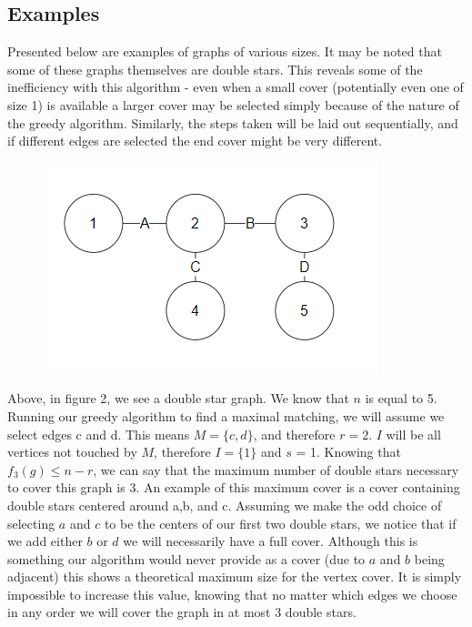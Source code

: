 \documentclass{article}
\begin{document}
		\subsection{Examples}
		Presented below are examples of graphs of various sizes. It may be noted that some of these graphs themselves are double stars. This reveals some of the inefficiency with this algorithm - even when a small cover (potentially even one of size 1) is available a larger cover may be selected simply because of the nature of the greedy algorithm. Similarly, the steps taken will be laid out sequentially, and if different edges are selected the end cover might be very different.
		 \\
				\begin{figure}[H]
				\caption{}
				\includegraphics{Figure2}
			\end{figure}
			Above, in figure 2, we see a double star graph. We know that $n$ is equal to 5. Running our greedy algorithm to find a maximal matching, we will assume we select edges c and d. This means $M = \{c,d\}$, and therefore $r = 2$. $I$ will be all vertices not touched by $M$, therefore $I = \{1\}$ and $s$ = 1. Knowing that $f_{3}(g) \leq n-r$, we can say that the maximum number of double stars necessary to cover this graph is 3. An example of this maximum cover is a cover containing double stars centered around a,b, and c. Assuming we make the odd choice of selecting $a$ and $c$ to be the centers of our first two double stars, we notice that if we add either $b$ or $d$ we will necessarily have a full cover. Although this is something our algorithm would never provide as a cover (due to $a$ and $b$ being adjacent) this shows a theoretical maximum size for the vertex cover. It is simply impossible to increase this value, knowing that no matter which edges we choose in any order we will cover the graph in at most 3 double stars.
			
\end{document}
